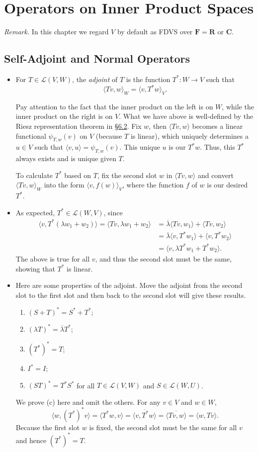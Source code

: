 \documentclass[11pt]{article}
\newcommand{\lk}[2]{\hyperlink{subsection.#1.#2}{\S#1.#2}}
\newcommand{\df}[1]{\textit{\textsf{#1}}}
\newcommand{\R}{\mathbf{R}}
\newcommand{\C}{\mathbf{C}}
\newcommand{\F}{\mathbf{F}}
\newcommand{\conj}[1]{\overline{#1}}
\newcommand{\inp}[2]{\langle #1, #2 \rangle}
\newcommand{\LVW}{\mathcal{L}(V,W)}
\begin{document}
\newpage
\section{Operators on Inner Product Spaces}
\textit{Remark.} In this chapter we regard $V$ by default as FDVS over $\F = \R$ or $\C$.
\subsection{Self-Adjoint and Normal Operators}
\begin{itemize}
    \item For $T \in \LVW$, the \df{adjoint} of $T$ is the function $T^*: W \to V$ such that $$\inp{Tv}{w}_W = \inp{v}{T^*w}_V.$$
    
    Pay attention to the fact that the inner product on the left is on $W$, while the inner product on the right is on $V$. What we have above is well-defined by the Riesz representation theorem in \lk{6}{2}. Fix $w$, then $\inp{Tv}{w}$ becomes a linear functional $\psi_{T,w}(v)$ on $V$ (because $T$ is linear), which uniquely determines a $u \in V$ such that $\inp{v}{u} = \psi_{T,w}(v)$. This unique $u$ is our $T^*w$. Thus, this $T^*$ always exists and is unique given $T$.
    
    To calculate $T^*$ based on $T$, fix the second slot $w$ in $\inp{Tv}{w}$ and convert $\inp{Tv}{w}_W$ into the form $\inp{v}{f(w)}_V$, where the function $f$ of $w$ is our desired $T^*$.
    \item As expected, $T^* \in \mathcal{L}(W,V)$, since
    \begin{align*}
        \inp{v}{T^*(\lambda w_1 + w_2)} = \inp{Tv}{\lambda w_1 + w_2} & = \conj{\lambda}\inp{Tv}{w_1} + \inp{Tv}{w_2} \\ & = \conj{\lambda}\inp{v}{T^*w_1} + \inp{v}{T^*w_2} \\ & = \inp{v}{\lambda T^* w_1 + T^*w_2}.
    \end{align*}
    The above is true for all $v$, and thus the second slot must be the same, showing that $T^*$ is linear.
    \item Here are some properties of the adjoint. Move the adjoint from the second slot to the first slot and then back to the second slot will give these results.
    \begin{enumerate}[label=(\alph*)]
        \item $(S+T)^* = S^* + T^*$;
        \item $(\lambda T)^* = \conj{\lambda}T^*$;
        \item $(T^*)^* = T$;
        \item $I^* = I$;
        \item $(ST)^* = T^*S^*$ for all $T \in \LVW$ and $S \in \mathcal{L}(W,U)$.
    \end{enumerate}
    We prove (c) here and omit the others. For any $v \in V$ and $w \in W$, $$\inp{w}{(T^*)^*v} = \inp{T^*w}{v} = \conj{\inp{v}{T^*w}} = \conj{\inp{Tv}{w}} = \inp{w}{Tv}.$$ Because the first slot $w$ is fixed, the second slot must be the same for all $v$ and hence $(T^*)^*=T$.
    

\end{itemize}
\end{document}
